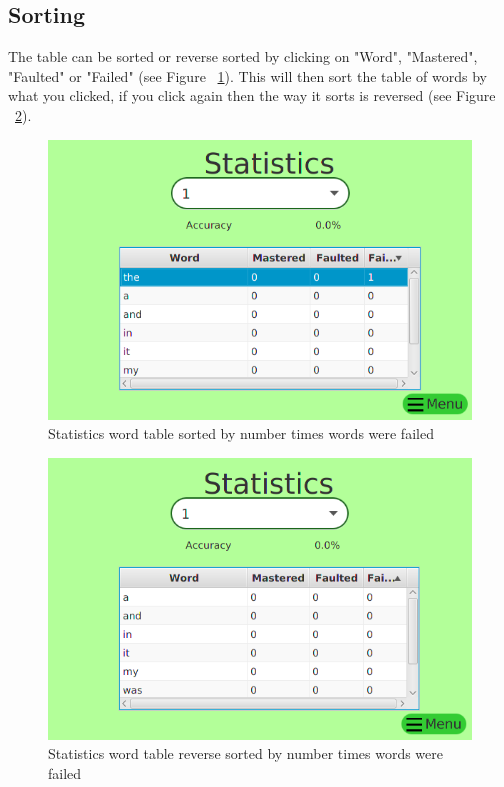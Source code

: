 \documentclass[12pt,a4paper,titlepage,onecolumn]{article}
\begin{document}
	\subsection{Sorting}
	The table can be sorted or reverse sorted by clicking on "Word", "Mastered", "Faulted" or "Failed" (see Figure ~\ref{fig:StatisticsFailedSorted1}). This will then sort the table of words by what you clicked, if you click again then the way it sorts is reversed (see Figure ~\ref{fig:StatisticsFailedSorted2}).
	\begin{figure}[h]
		\centering
		\includegraphics[width=1\linewidth]{Figures/Statistics/StatisticsFailedSorted1}
		\caption[Sorted by Failed]{Statistics word table sorted by number times words were failed}
		\label{fig:StatisticsFailedSorted1}
	\end{figure}
	\begin{figure}[h]
		\centering
		\includegraphics[width=1\linewidth]{Figures/Statistics/StatisticsFailedSorted2}
		\caption[Reverse Sorted by Failed]{Statistics word table reverse sorted by number times words were failed}
		\label{fig:StatisticsFailedSorted2}
	\end{figure}
	
\end{document}
